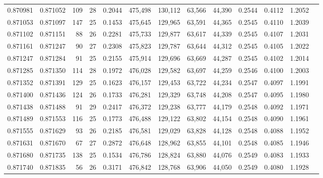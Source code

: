 \begin{tabular}{rrrrrrrrrrrrr}
0.870981 & 0.871052 &   109 &  28 &                                     0.2044 & 475,498 & 130,112 &  63,566 &  44,390 & 0.2544 & 0.4112 & 1.2052 \\
0.871053 & 0.871097 &   147 &  25 &                                     0.1453 & 475,645 & 129,965 &  63,591 &  44,365 & 0.2545 & 0.4110 & 1.2039 \\
0.871102 & 0.871151 &    88 &  26 &                                     0.2281 & 475,733 & 129,877 &  63,617 &  44,339 & 0.2545 & 0.4107 & 1.2031 \\
0.871161 & 0.871247 &    90 &  27 &                                     0.2308 & 475,823 & 129,787 &  63,644 &  44,312 & 0.2545 & 0.4105 & 1.2022 \\
0.871247 & 0.871284 &    91 &  25 &                                     0.2155 & 475,914 & 129,696 &  63,669 &  44,287 & 0.2545 & 0.4102 & 1.2014 \\
0.871285 & 0.871350 &   114 &  28 &                                     0.1972 & 476,028 & 129,582 &  63,697 &  44,259 & 0.2546 & 0.4100 & 1.2003 \\
0.871352 & 0.871391 &   129 &  25 &                                     0.1623 & 476,157 & 129,453 &  63,722 &  44,234 & 0.2547 & 0.4097 & 1.1991 \\
0.871400 & 0.871436 &   124 &  26 &                                     0.1733 & 476,281 & 129,329 &  63,748 &  44,208 & 0.2547 & 0.4095 & 1.1980 \\
0.871438 & 0.871488 &    91 &  29 &                                     0.2417 & 476,372 & 129,238 &  63,777 &  44,179 & 0.2548 & 0.4092 & 1.1971 \\
0.871489 & 0.871553 &   116 &  25 &                                     0.1773 & 476,488 & 129,122 &  63,802 &  44,154 & 0.2548 & 0.4090 & 1.1961 \\
0.871555 & 0.871629 &    93 &  26 &                                     0.2185 & 476,581 & 129,029 &  63,828 &  44,128 & 0.2548 & 0.4088 & 1.1952 \\
0.871631 & 0.871670 &    67 &  27 &                                     0.2872 & 476,648 & 128,962 &  63,855 &  44,101 & 0.2548 & 0.4085 & 1.1946 \\
0.871680 & 0.871735 &   138 &  25 &                                     0.1534 & 476,786 & 128,824 &  63,880 &  44,076 & 0.2549 & 0.4083 & 1.1933 \\
0.871740 & 0.871835 &    56 &  26 &                                     0.3171 & 476,842 & 128,768 &  63,906 &  44,050 & 0.2549 & 0.4080 & 1.1928 \\

\end{tabular}
